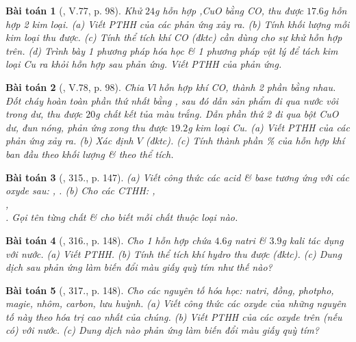 \documentclass{article}
\newtheorem{baitoan}{Bài toán}
\begin{document}
\begin{baitoan}[\cite{Truong_BTNC_Hoa_Hoc_8_2022}, V.77, p. 98]
	Khử $24$\emph{g} hỗn hợp \emph{,CuO} bằng \emph{CO}, thu được $17.6$\emph{g} hỗn hợp 2 kim loại. (a) Viết PTHH của các phản ứng xảy ra. (b) Tính khối lượng mỗi kim loại thu được. (c) Tính thể tích khí \emph{CO} (đktc) cần dùng cho sự khử hỗn hợp trên. (d) Trình bày 1 phương pháp hóa học \& 1 phương pháp vật lý để tách kim loại \emph{Cu} ra khỏi hỗn hợp sau phản ứng. Viết PTHH của phản ứng.
\end{baitoan}

\begin{baitoan}[\cite{Truong_BTNC_Hoa_Hoc_8_2022}, V.78, p. 98]
	Chia $V$\emph{l} hỗn hợp khí \emph{CO,} thành 2 phần bằng nhau. Đốt cháy hoàn toàn phần thứ nhất bằng \emph{}, sau đó dẫn sản phẩm đi qua nước vôi trong dư, thu được $20$\emph{g} chất kết tủa màu trắng. Dẫn phần thứ 2 đi qua bột \emph{CuO} dư, đun nóng, phản ứng xong thu được $19.2$\emph{g} kim loại \emph{Cu}. (a) Viết PTHH của các phản ứng xảy ra. (b) Xác định $V$ (đktc). (c) Tính thành phần \% của hỗn hợp khí ban đầu theo khối lượng \& theo thể tích. 
\end{baitoan}

\begin{baitoan}[\cite{An_400_BT_Hoa_Hoc_8_2020}, 315., p. 147]
	(a) Viết công thức các acid \& base tương ứng với các oxyde sau: \emph{, }. (b) Cho các CTHH: \emph{},\\\emph{},\\\emph{}. Gọi tên từng chất \& cho biết mỗi chất thuộc loại nào.
\end{baitoan}

\begin{baitoan}[\cite{An_400_BT_Hoa_Hoc_8_2020}, 316., p. 148]
	Cho 1 hỗn hợp chứa $4.6$\emph{g} natri \& $3.9$\emph{g} kali tác dụng với nước. (a) Viết PTHH. (b) Tính thể tích khí hydro thu được (đktc). (c) Dung dịch sau phản ứng làm biến đổi màu giấy quỳ tím như thế nào?
\end{baitoan}

\begin{baitoan}[\cite{An_400_BT_Hoa_Hoc_8_2020}, 317., p. 148]
	Cho các nguyên tố hóa học: natri, đồng, photpho, magie, nhôm, carbon, lưu huỳnh. (a) Viết công thức các oxyde của những nguyên tố này theo hóa trị cao nhất của chúng. (b) Viết PTHH của các oxyde trên (nếu có) với nước. (c) Dung dịch nào phản ứng làm biến đổi màu giấy quỳ tím?
\end{baitoan}
\end{document}
